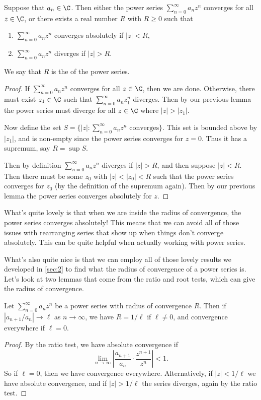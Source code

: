 \begin{theorem}
	Suppose that $a_n \in \C$. Then either the power series $\sum_{n = 0}^\infty a_n z^n$ converges for all $z \in \C$, or there exists a real number $R$ with $R \geq 0$ such that
	\begin{enumerate}[label=(\roman*)]
		\item $\sum_{n =0}^\infty a_n z^n$ converges absolutely if $|z| < R$,
		\item $\sum_{n =0}^\infty a_n z^n$ diverges if $|z| > R$.
	\end{enumerate}
	We say that $R$ is the  of the power series.
\end{theorem}
\begin{proof}
	If $\sum_{n = 0}^\infty a_n z^n$ converges for all $z \in \C$, then we are done. Otherwise, there must exist $z_1 \in \C$ such that $\sum_{n = 0}^{\infty} a_n z_1^n$ diverges. Then by our previous lemma the power series must diverge for all $z \in \C$ where $|z| > |z_1|$.

	Now define the set $S = \{|z| : \sum_{n = 0}^\infty a_n z^n \text{ converges}\}$. This set is bounded above by $|z_1|$, and is non-empty since the power series converges for $z = 0$. Thus it has a supremum, say $R = \sup S$. 

	Then by definition $\sum_{n = 0}^{\infty} a_n z^n$ diverges if $|z| > R$, and then suppose $|z| < R$. Then there must be some $z_0$ with $|z| < |z_0| < R$ such that the power series converges for $z_0$ (by the definition of the supremum again). Then by our previous lemma the power series converges absolutely for $z$.
\end{proof}

What's quite lovely is that when we are inside the radius of convergence, the power series converges absolutely! This means that we can avoid all of those issues with rearranging series that show up when things don't converge absolutely. This can be quite helpful when actually working with power series.

What's also quite nice is that we can employ all of those lovely results we developed in \autoref{sec:2} to find what the radius of convergence of a power series is.
Let's look at two lemmas that come from the ratio and root tests, which can give the radius of convergence. 

\begin{lemma}
	Let $\sum_{n = 0}^{\infty} a_n z^n$ be a power series with radius of convergence $R$.
	Then if $|a_{n + 1}/a_n| \rightarrow \ell$ as $n \rightarrow \infty$, we have $R = 1/\ell$ if $\ell \neq 0$, and convergence everywhere if $\ell = 0$.
\end{lemma}
\begin{proof}
	By the ratio test, we have absolute convergence if 
	$$
	\lim_{n \to \infty} \left|\frac{a_{n + 1}}{a_{n}} \cdot \frac{z^{n + 1}}{z^n}\right| < 1.
	$$
	So if $\ell = 0$, then we have convergence everywhere. Alternatively, if $|z| < 1/\ell$ we have absolute convergence, and if $|z| > 1/\ell$ the series diverges, again by the ratio test.
\end{proof}

